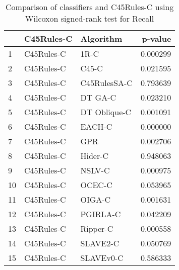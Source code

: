 \begin{table}
\footnotesize
\caption{Comparison of classifiers and C45Rules-C using Wilcoxon signed-rank test for Recall}
\label{tab:C45Rules-C wilcoxon Recall comparison}
\begin{tabular}{lllr}
\hline
 & C45Rules-C & Algorithm & p-value \\
\hline
1 & C45Rules-C & 1R-C & 0.000299 \\
2 & C45Rules-C & C45-C & 0.021595 \\
3 & C45Rules-C & C45RulesSA-C & 0.793639 \\
4 & C45Rules-C & DT GA-C & 0.023210 \\
5 & C45Rules-C & DT Oblique-C & 0.001091 \\
6 & C45Rules-C & EACH-C & 0.000000 \\
7 & C45Rules-C & GPR & 0.002706 \\
8 & C45Rules-C & Hider-C & 0.948063 \\
9 & C45Rules-C & NSLV-C & 0.000975 \\
10 & C45Rules-C & OCEC-C & 0.053965 \\
11 & C45Rules-C & OIGA-C & 0.001631 \\
12 & C45Rules-C & PGIRLA-C & 0.042209 \\
13 & C45Rules-C & Ripper-C & 0.000558 \\
14 & C45Rules-C & SLAVE2-C & 0.050769 \\
15 & C45Rules-C & SLAVEv0-C & 0.586333 \\
\hline
\end{tabular}
\end{table}
